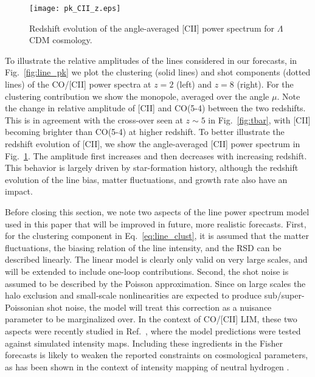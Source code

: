 \documentclass[twocolumn]{aastex631}
\begin{document}
\begin{figure}[t]
    \flushleft\texttt{[image: pk\_CII\_z.eps]}\vspace{-.1in}
    \caption{Redshift evolution of the angle-averaged [CII] power spectrum for $\Lambda$CDM cosmology.} 
    \label{fig:pk_CII_z}\vspace{.1in}
\end{figure}
To illustrate the relative amplitudes of the lines considered in our forecasts, in Fig.~\ref{fig:line_pk} we plot the clustering (solid lines) and shot components (dotted lines) of the CO/[CII] power spectra at $z=2$ (left) and $z=8$ (right). For the clustering contribution we show the monopole, averaged over the angle $\mu$. Note the change in relative amplitude of [CII] and CO(5-4) between the two redshifts. This is in agreement with the cross-over seen at $z\sim 5$ in Fig.~\ref{fig:tbar}, with [CII] becoming brighter than CO(5-4) at higher redshift. To better illustrate the redshift evolution of [CII], we show the angle-averaged [CII] power spectrum in Fig.~\ref{fig:pk_CII_z}. The amplitude first increases and then decreases with increasing redshift. This behavior is largely driven by star-formation history, although the redshift evolution of the line bias, matter fluctuations, and growth rate also have an impact. 

Before closing this section, we note two aspects of the line power spectrum model used in this paper that will be improved in future, more realistic forecasts. First, for the clustering component in Eq.~\eqref{eq:line_clust}, it is assumed that the matter fluctuations, the biasing relation of the line intensity, and the RSD can be described linearly. The linear model is clearly only valid on very large scales, and will be extended to include one-loop contributions. Second, the shot noise is assumed to be described by the Poisson approximation. Since on large scales the halo exclusion and small-scale nonlinearities are expected to produce sub/super-Poissonian shot noise, the model will treat this correction as a nuisance parameter to be marginalized over. In the context of CO/[CII] LIM, these two aspects were recently studied in Ref.~\citep{MoradinezhadDizgah:2021dei}, where the model predictions were tested against simulated intensity maps. Including these ingredients in the Fisher forecasts is likely to weaken the reported constraints on cosmological parameters, as has been shown in the context of intensity mapping of neutral hydrogen \citep{Sailer:2021yzm}. 
\end{document}
